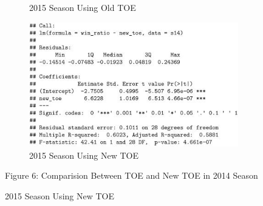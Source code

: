 \documentclass[11pt]{article}
\begin{document}
\begin{figure}[h!]
\begin{subfigure}[b]{0.42\linewidth}
    \caption{2015 Season Using Old TOE}
  \end{subfigure}
  \begin{subfigure}[b]{0.42\linewidth}
    \includegraphics[width=\linewidth]{14newsummary.jpg}
    \caption{2015 Season Using New TOE}
  \end{subfigure}
\bigskip

Figure 6: Comparision Between TOE and New TOE in 2014 Season

\end{figure}
\end{document}
